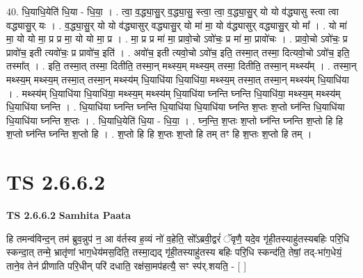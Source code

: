 \documentclass[17pt]{extarticle}
\begin{document}
40. धि॒याधि॒येति॑ धि॒या - धि॒या॒ । . त्वा॒ व॒द्ध्या॒सु॒र् व॒द्ध्या॒सु॒ स्त्वा॒ त्वा॒ व॒द्ध्या॒सु॒र् यो यो व॑द्ध्यासु स्त्वा त्वा वद्ध्यासु॒र् यः । . व॒द्ध्या॒सु॒र् यो यो व॑द्ध्यासुर् वद्ध्यासु॒र् यो मा॑ मा॒ यो व॑द्ध्यासुर् वद्ध्यासु॒र् यो मा᳚ । . यो मा॑ मा॒ यो यो मा॒ प्र प्र मा॒ यो यो मा॒ प्र । . मा॒ प्र प्र मा॑ मा॒ प्रावो॒चो ऽवो॑चः॒ प्र मा॑ मा॒ प्रावो॑चः । . प्रावो॒चो ऽवो॑चः॒ प्र प्रावो॑च॒ इती त्यवो॑चः॒ प्र प्रावो॑च॒ इति॑ । . अवो॑च॒ इती त्यवो॒चो ऽवो॑च॒ इति॒ तस्मा॒त् तस्मा॒ दित्यवो॒चो ऽवो॑च॒ इति॒ तस्मा᳚त् । . इति॒ तस्मा॒त् तस्मा॒ दितीति॒ तस्मा॒न् मथ्स्य॒म् मथ्स्य॒म् तस्मा॒ दितीति॒ तस्मा॒न् मथ्स्य᳚म् । . तस्मा॒न् मथ्स्य॒म् मथ्स्य॒म् तस्मा॒त् तस्मा॒न् मथ्स्य॑म् धि॒याधि॑या धि॒याधि॑या॒ मथ्स्य॒म् तस्मा॒त् तस्मा॒न् मथ्स्य॑म् धि॒याधि॑या । . मथ्स्य॑म् धि॒याधि॑या धि॒याधि॑या॒ मथ्स्य॒म् मथ्स्य॑म् धि॒याधि॑या घ्नन्ति घ्नन्ति धि॒याधि॑या॒ मथ्स्य॒म् मथ्स्य॑म् धि॒याधि॑या घ्नन्ति । . धि॒याधि॑या घ्नन्ति घ्नन्ति धि॒याधि॑या धि॒याधि॑या घ्नन्ति श॒प्तः श॒प्तो घ्न॑न्ति धि॒याधि॑या धि॒याधि॑या घ्नन्ति श॒प्तः । . धि॒याधि॒येति॑ धि॒या - धि॒या॒ । . घ्न॒न्ति॒ श॒प्तः श॒प्तो घ्न॑न्ति घ्नन्ति श॒प्तो हि हि श॒प्तो घ्न॑न्ति घ्नन्ति श॒प्तो हि । . श॒प्तो हि हि श॒प्तः श॒प्तो हि तम् तꣳ हि श॒प्तः श॒प्तो हि तम् । \newline
\pagebreak
{}
\section*{ TS 2.6.6.2 }

\textbf{TS 2.6.6.2 } \newline
\textbf{Samhita Paata} \newline

हि तमन्व॑विन्द॒न् तम॑ ब्रुव॒न्नुप॑ न॒ आ व॑र्तस्व ह॒व्यं नो॑ व॒हेति॒ सो᳚ऽब्रवी॒द्वरं॑ ॅवृणै॒ यदे॒व गृ॑ही॒तस्याहु॑तस्यबहिः परि॒धि स्कन्दा॒त् तन्मे॒ भ्रातृ॑णां भाग॒धेय॑मस॒दिति॒ तस्मा॒द्यद् गृ॑ही॒तस्याहु॑तस्य बहिः परि॒धि स्कन्द॑ति॒ तेषां॒ तद्-भा॑ग॒धेयं॒ ताने॒व तेन॑ प्रीणाति परि॒धीन् परि॑ दधाति॒ रक्ष॑सा॒मप॑हत्यै॒ सꣳ स्प॑र्.शयति॒ - [  ] \newline
\end{document}
